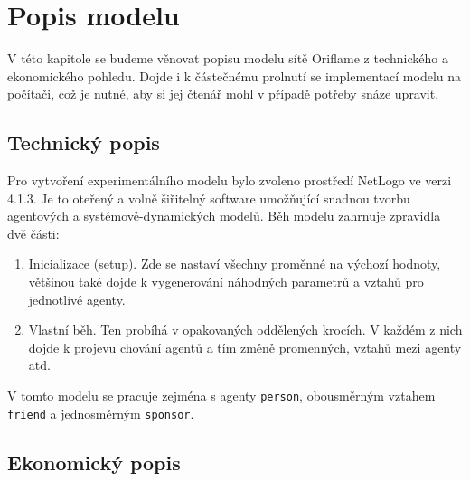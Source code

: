 \documentclass[a4wide,12pt]{report}
\begin{document}
\chapter{Popis modelu}
V této kapitole se budeme věnovat popisu modelu sítě Oriflame z technického a ekonomického pohledu. Dojde i k částečnému prolnutí se implementací modelu na počítači, což je nutné, aby si jej čtenář mohl v případě potřeby snáze upravit.
\section{Technický popis}
Pro vytvoření experimentálního modelu bylo zvoleno prostředí NetLogo ve verzi 4.1.3. Je to oteřený a volně šiřitelný software umožňující snadnou tvorbu agentových a systémově-dynamických modelů. Běh modelu zahrnuje zpravidla dvě části:
\begin{enumerate}
\item Inicializace (setup). Zde se nastaví všechny proměnné na výchozí hodnoty, většinou také dojde k vygenerování náhodných parametrů a vztahů pro jednotlivé agenty.
\item Vlastní běh. Ten probíhá v opakovaných oddělených krocích. V každém z nich dojde k projevu chování agentů a tím změně promenných, vztahů mezi agenty atd.
\end{enumerate}
V tomto modelu se pracuje zejména s agenty \texttt{person}, obousměrným vztahem \texttt{friend} a jednosměrným \texttt{sponsor}.
\section{Ekonomický popis}
\end{document}
